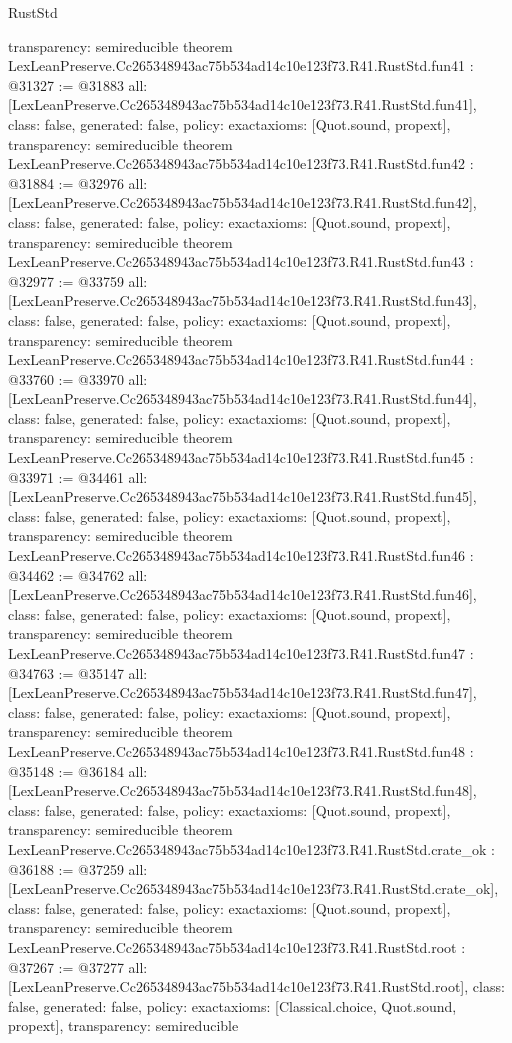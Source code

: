 \begin{lexlean}{RustStd}
\begin{coremodule}
{  transparency: semireducible
}
theorem LexLeanPreserve.Cc265348943ac75b534ad14c10e123f73.R41.RustStd.fun41 : @31327 := @31883 {
  all: [LexLeanPreserve.Cc265348943ac75b534ad14c10e123f73.R41.RustStd.fun41],
  class: false,
  generated: false,
  policy: exact{axioms: [Quot.sound, propext]},
  transparency: semireducible
}
theorem LexLeanPreserve.Cc265348943ac75b534ad14c10e123f73.R41.RustStd.fun42 : @31884 := @32976 {
  all: [LexLeanPreserve.Cc265348943ac75b534ad14c10e123f73.R41.RustStd.fun42],
  class: false,
  generated: false,
  policy: exact{axioms: [Quot.sound, propext]},
  transparency: semireducible
}
theorem LexLeanPreserve.Cc265348943ac75b534ad14c10e123f73.R41.RustStd.fun43 : @32977 := @33759 {
  all: [LexLeanPreserve.Cc265348943ac75b534ad14c10e123f73.R41.RustStd.fun43],
  class: false,
  generated: false,
  policy: exact{axioms: [Quot.sound, propext]},
  transparency: semireducible
}
theorem LexLeanPreserve.Cc265348943ac75b534ad14c10e123f73.R41.RustStd.fun44 : @33760 := @33970 {
  all: [LexLeanPreserve.Cc265348943ac75b534ad14c10e123f73.R41.RustStd.fun44],
  class: false,
  generated: false,
  policy: exact{axioms: [Quot.sound, propext]},
  transparency: semireducible
}
theorem LexLeanPreserve.Cc265348943ac75b534ad14c10e123f73.R41.RustStd.fun45 : @33971 := @34461 {
  all: [LexLeanPreserve.Cc265348943ac75b534ad14c10e123f73.R41.RustStd.fun45],
  class: false,
  generated: false,
  policy: exact{axioms: [Quot.sound, propext]},
  transparency: semireducible
}
theorem LexLeanPreserve.Cc265348943ac75b534ad14c10e123f73.R41.RustStd.fun46 : @34462 := @34762 {
  all: [LexLeanPreserve.Cc265348943ac75b534ad14c10e123f73.R41.RustStd.fun46],
  class: false,
  generated: false,
  policy: exact{axioms: [Quot.sound, propext]},
  transparency: semireducible
}
theorem LexLeanPreserve.Cc265348943ac75b534ad14c10e123f73.R41.RustStd.fun47 : @34763 := @35147 {
  all: [LexLeanPreserve.Cc265348943ac75b534ad14c10e123f73.R41.RustStd.fun47],
  class: false,
  generated: false,
  policy: exact{axioms: [Quot.sound, propext]},
  transparency: semireducible
}
theorem LexLeanPreserve.Cc265348943ac75b534ad14c10e123f73.R41.RustStd.fun48 : @35148 := @36184 {
  all: [LexLeanPreserve.Cc265348943ac75b534ad14c10e123f73.R41.RustStd.fun48],
  class: false,
  generated: false,
  policy: exact{axioms: [Quot.sound, propext]},
  transparency: semireducible
}
theorem LexLeanPreserve.Cc265348943ac75b534ad14c10e123f73.R41.RustStd.crate_ok : @36188 := @37259 {
  all: [LexLeanPreserve.Cc265348943ac75b534ad14c10e123f73.R41.RustStd.crate_ok],
  class: false,
  generated: false,
  policy: exact{axioms: [Quot.sound, propext]},
  transparency: semireducible
}
theorem LexLeanPreserve.Cc265348943ac75b534ad14c10e123f73.R41.RustStd.root : @37267 := @37277 {
  all: [LexLeanPreserve.Cc265348943ac75b534ad14c10e123f73.R41.RustStd.root],
  class: false,
  generated: false,
  policy: exact{axioms: [Classical.choice, Quot.sound, propext]},
  transparency: semireducible
}


\end{coremodule}
\end{lexlean}
